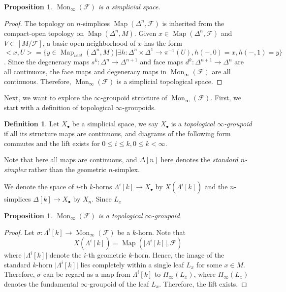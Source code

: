 \documentclass[12pt]{amsart}
\newtheorem{prop}[thm]{Proposition}
\theoremstyle{definition}
\newtheorem{defn}[thm]{Definition}
\theoremstyle{remark}
\numberwithin{equation}{section}
\newcommand{\CF}{{\mathcal F}}
\newcommand{\1}{{\mathbb{1}}}
\newcommand{\map}{\operatorname{Map}}
\newcommand{\mon}{\operatorname{Mon}}
\begin{document}
\begin{prop}
	$\mon_{\infty}(\CF)$ is a simplicial space.
\end{prop}
\begin{proof}
	The topology on $n$-simplices $\map(\Delta^n, \mathcal{F})$ is inherited from the compact-open topology on $\map(\Delta^n, M)$. Given  $x\in \map(\Delta^n, \mathcal{F})$ and $V\subset [M/\mathcal{F}]$, a basic open neighborhood of $x$ has the form 
	$$<x, U> = \{y \in \map_{vect}(\Delta^n, M)\big|\exists h: \Delta^n \times \Delta^1 \to \pi^{-1}(U), h(-, 0) = x, h(-, 1)=y \}$$. Since the degeneracy maps $s^k: \Delta^n \to \Delta^{n+1}$ and face maps $d^k:\Delta^{n+1} \to  \Delta^n $ are all continuous, the face maps and degeneracy maps in $\mon_{\infty}(\CF)$ are all continuous. Therefore, $\mon_{\infty}(\CF)$ is a simplicial topological space.
	
	\end{proof}

Next, we want to explore the $\infty$-groupoid structure of $\mon_{\infty}(\CF)$. First, we start with a definition of topological $\infty$-groupoids.

\begin{defn}
	Let $X_{\bullet}$ be a simplicial space, we say $X_{\bullet}$ is a {\it topological $\infty$-groupoid} if all its structure maps are continuous, and diagrams of the following form commutes and the lift exists for $0\le i \le k, 0\le k < \infty$.
	\begin{center}
	\end{center}
Note that here all maps are continuous, and $\Delta[n]$ here denotes the {\it standard $n$-simplex} rather than the geometric $n$-simplex.
\end{defn} 
We denote the space of $i$-th $k$-horns $\Lambda^i[k] \to X_{\bullet} $ by $ X(\Lambda^i[k])$ and the $n$-simplices $\Delta [k] \to X_{\bullet} $ by $X_n$. Since $L_x$
\begin{prop}
	$\mon_{\infty}(\CF)$ is a topological $\infty$-groupoid.
\end{prop}

\begin{proof} 
	Let $\sigma:\Lambda^i[k]\to \mon_{\infty}(\CF)$ be a $k$-horn. Note that
	$$
	X(\Lambda^i[k]) = \map(\big|\Lambda^i[k]\big|, \CF)
	$$
	where $\big|\Lambda^i[k]\big|$ denote the $i$-th geometric $k$-horn. Hence, the image of the standard $k$-horn $\big|\Lambda^i[k]\big|$ lies completely within a single leaf $L_x$ for some $x\in M$. Therefore, 
	$\sigma $ can be regard as a map from $ \Lambda^i[k]$ to $ \Pi_{\infty}(L_x)$, where $\Pi_{\infty}(L_x)$ denotes the fundamental $\infty$-groupoid of the leaf $L_x$. Therefore, the lift exists.
	\end{proof}
\end{document}

